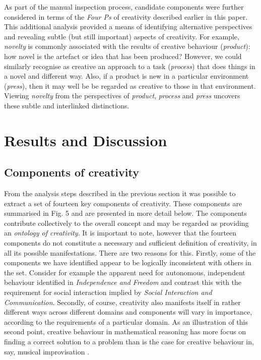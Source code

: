 \documentclass[10pt,letterpaper]{article}
\begin{document}
As part of the manual inspection process, candidate components were further considered in terms of the {\em Four Ps} of creativity \cite{rhodes61,mooney63,mackinnon70,kaufman09} described earlier in this paper. This additional analysis provided a means of identifying alternative perspectives and revealing subtle (but still important) aspects of creativity.  For example, {\em novelty} is commonly associated with the results of creative behaviour ({\em product\/}): how novel is the artefact or idea that has been produced? However, we could similarly recognise as creative an approach to a task  ({\em process\/}) that does things in a novel and different way.  Also, if a product is new in a particular environment ({\em press\/}), then it may well be be regarded as creative to those in that environment. Viewing {\em novelty} from the perspectives of {\em product}, {\em process} and {\em press} uncovers these subtle and interlinked distinctions.

\section*{Results and Discussion}
\label{results}

\subsection*{Components of creativity}\label{componentsResults}


From the analysis steps described in the previous section it was possible to extract a set of fourteen key components of creativity. These components are summarised in Fig. 5 %
and are presented in more detail below. The components contribute collectively to the overall concept and may be regarded as providing an {\em ontology of creativity\/}.  It is important to note, however that the fourteen components do not constitute a necessary and sufficient definition of creativity, in all its possible manifestations. There are two reasons for this. Firstly, some of the components we have identified appear to be logically inconsistent with others in the set. Consider for example the apparent need for autonomous, independent behaviour identified in {\em Independence and Freedom\/} and contrast this with the requirement for social interaction implied by {\em Social Interaction and Communication\/}. %
Secondly, of course, creativity %
also manifests itself in rather different ways across different domains \cite{plucker04} and components will vary in importance, according to the requirements of a particular domain. As an illustration of this second point, %
creative behaviour in mathematical reasoning has more focus on finding a correct solution to a problem than is the case for creative behaviour in, say,  musical improvisation \cite{colton08,jordanous12jims}. 
\end{document}
